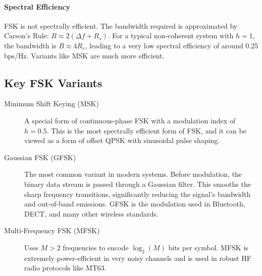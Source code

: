 \paragraph{Spectral Efficiency}
FSK is not spectrally efficient. The bandwidth required is approximated by Carson's Rule: $B \approx 2(\Delta f + R_s)$. For a typical non-coherent system with $h=1$, the bandwidth is $B \approx 4R_s$, leading to a very low spectral efficiency of around 0.25 bps/Hz. Variants like MSK are much more efficient.


\subsection{Key FSK Variants}

\begin{description}
    \item[Minimum Shift Keying (MSK)] A special form of continuous-phase FSK with a modulation index of $h=0.5$. This is the most spectrally efficient form of FSK, and it can be viewed as a form of offset QPSK with sinusoidal pulse shaping.
    \item[Gaussian FSK (GFSK)] The most common variant in modern systems. Before modulation, the binary data stream is passed through a Gaussian filter. This smooths the sharp frequency transitions, significantly reducing the signal's bandwidth and out-of-band emissions. GFSK is the modulation used in Bluetooth, DECT, and many other wireless standards.
    \item[Multi-Frequency FSK (MFSK)] Uses $M>2$ frequencies to encode $\log_2(M)$ bits per symbol. MFSK is extremely power-efficient in very noisy channels and is used in robust HF radio protocols like MT63.
\end{description}


